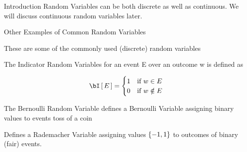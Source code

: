 \documentclass{article}
\begin{document}
\begin{ssection}{Introduction}
	Random Variables can be both discrete as well as continuous. We will discuss continuous random variables later.

	\begin{ssubsection}{Other Examples of Common Random Variables}

		These are some of the commonly used (discrete) random variables

		\begin{example}
			The Indicator Random Variables for an event E over an outcome w is defined as

			\begin{align*}
				\is{E} = \begin{cases}
					1	&	\mt{if} w \in E		\\
					0	&	\mt{if} w \notin E
				\end{cases}
			\end{align*}
		\end{example}

		\begin{example}
			The Bernoulli Random Variable defines a Bernoulli Variable assigning binary values to events  toss of a coin
		\end{example}

		\begin{example}
			Defines a Rademacher Variable assigning values $\left\{ {-1, 1} \right\}$ to outcomes of binary (fair) events.
		\end{example}
	\end{ssubsection}

\end{ssection}
\end{document}
